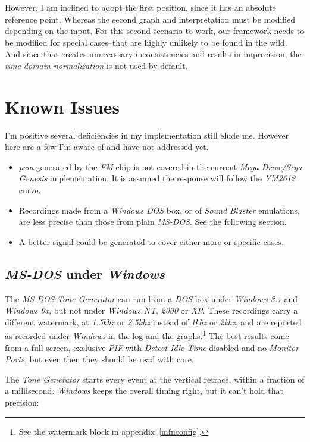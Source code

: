\documentclass[10pt,a4paper]{report}
\newcommand{\ac}[1]{\textit{\mbox{\acrshort{#1}}}}
\newcommand{\khz}[1]{\textit{\mbox{#1\acrshort{khz}}}}
\begin{document}
\begin{appendices}
However, I am inclined to adopt the first position, since it has an absolute reference point. Whereas the second graph and interpretation must be modified depending on the input. For this second scenario to work, our framework needs to be modified for special cases--that are highly unlikely to be found in the wild. And since that creates unnecessary inconsistencies and results in imprecision, the \textit{time domain normalization} is not used by default.

\chapter{Known Issues}

I'm positive several deficiencies in my implementation still elude me. However here are a few I'm aware of and have not addressed yet.

\begin{itemize}
	\item \ac{pcm} generated by the \textit{FM} chip is not covered in the current \textit{Mega Drive/Sega Genesis} implementation. It is assumed the response will follow the \textit{YM2612} curve.
	\item Recordings made from a \textit{Windows} \textit{DOS} box, or of \textit{Sound Blaster} emulations, are less precise than those from plain \textit{MS-DOS}. See the following section.
	\item A better signal could  be generated to cover either more or specific cases.
\end{itemize}

\section{\textit{MS-DOS} under \textit{Windows}}

The \textit{MS-DOS} \textit{Tone Generator} can run from a \textit{DOS} box under \textit{Windows 3.x} and \textit{Windows 9x}, but not under \textit{Windows NT}, \textit{2000} or \textit{XP}. These recordings carry a different watermark, at \khz{1.5} or \khz{2.5} instead of \khz{1} or \khz{2}, and are reported as recorded under \textit{Windows} in the log and the graphs.\footnote{See the watermark block in appendix~\ref{mfnconfig}.} The best results come from a full screen, exclusive \textit{PIF} with \textit{Detect Idle Time} disabled and no \textit{Monitor Ports}, but even then they should be read with care.

The \textit{Tone Generator} starts every event at the vertical retrace, within a fraction of a millisecond. \textit{Windows} keeps the overall timing right, but it can't hold that precision:


\end{appendices}
\end{document}
